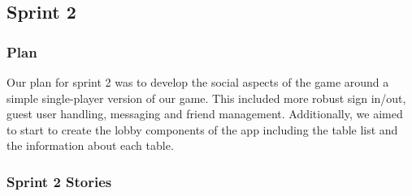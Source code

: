 \subsection{Sprint 2}


\subsubsection{Plan}

\noindent Our plan for sprint 2 was to develop the social aspects of the game around a simple single-player version of our game. This included more robust sign in/out, guest user handling, messaging and friend management. Additionally, we aimed to start to create the lobby components of the app including the table list and the information about each table.

\subsubsection{Sprint 2 Stories}

